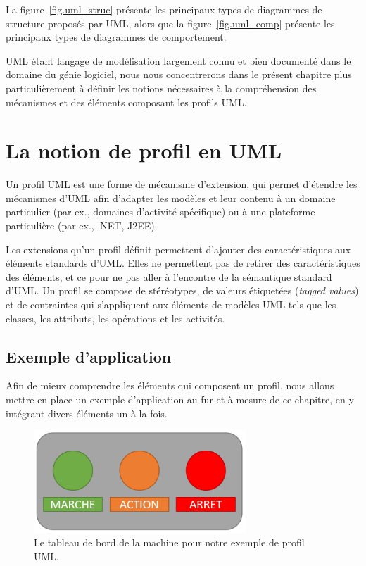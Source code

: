 
La figure~\ref{fig.uml_struc} présente les principaux types de diagrammes de structure proposés par UML,
alors que la figure~\ref{fig.uml_comp} présente les principaux types de diagrammes de comportement.

UML \'etant langage de modélisation largement connu et bien documenté dans le domaine du g\'enie logiciel,
nous nous concentrerons dans le pr\'esent chapitre plus particulièrement à définir les notions nécessaires à la compréhension des mécanismes et des éléments composant les profils UML.



\section{La notion de profil en UML}



Un profil UML est une forme de m\'ecanisme d'extension, qui
permet d'étendre les mécanismes d'UML afin d'adapter les mod\`eles et leur contenu à un domaine particulier (par ex.,  domaines d'activité spécifique) ou \`a une plateforme particulière (par ex.,  .NET, J2EE).

Les extensions qu'un profil d\'efinit permettent d'ajouter des caractéristiques aux éléments standards d'UML.
Elles ne permettent pas de retirer des caractéristiques des éléments, et ce pour ne pas aller à l'encontre de la sémantique standard d'UML.
Un profil se compose  de stéréotypes, de valeurs \'etiquet\'ees (\emph{tagged values}) et de contraintes qui s'appliquent aux éléments de modèles UML tels que les classes, les attributs, les opérations et les activités.

\subsection{Exemple d'application}
Afin de mieux comprendre les éléments qui composent un profil, nous allons mettre en place un exemple d'application au fur et à mesure de ce chapitre, en y intégrant divers éléments un \`a la fois.

\begin{figure}
    \centering
    \includegraphics[width=8cm]{10_img/chap4/example.PNG}
    \caption{Le tableau de bord de la machine pour notre exemple de profil UML.}
    \label{fig.uml_ex}
\end{figure}

